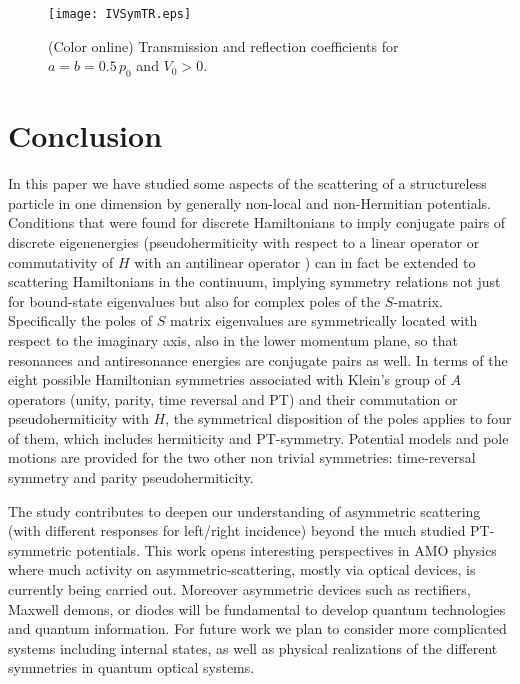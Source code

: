 \begin{figure}[t]
\begin{center}
\texttt{[image: IVSymTR.eps]}
\end{center}
\caption{(Color online) Transmission and reflection coefficients for $a=b=0.5\, p_0$ and $V_0>0$.}
\label{fig:T_R_fig2}
\end{figure}



%

\section{Conclusion}
\label{sec:RealEigenConclusions}

In this paper we have studied some aspects of the scattering of a structureless particle in one dimension by
generally non-local and non-Hermitian potentials.
Conditions that were found for discrete Hamiltonians to imply conjugate pairs of discrete eigenenergies
(pseudohermiticity with respect to a linear operator or commutativity of $H$ with an antilinear operator \cite{Mostafazadeh2002,Mostafazadeh2002a,Mostafazadeh2002b}) can in fact be extended to scattering Hamiltonians in the continuum, implying symmetry relations not just for bound-state eigenvalues
but also for complex
poles of the $S$-matrix. Specifically the poles of $S$ matrix eigenvalues
are symmetrically located with respect to the imaginary axis, also in the lower momentum plane, so that resonances and antiresonance
energies are conjugate pairs as well.
In  terms of the eight possible Hamiltonian symmetries associated with Klein's group of $A$ operators (unity, parity, time reversal and PT)
and their commutation or pseudohermiticity with $H$,
the symmetrical disposition of the poles applies to four of them, which includes hermiticity and PT-symmetry. Potential models
and pole motions are provided for the
two other non trivial symmetries: time-reversal symmetry and parity pseudohermiticity.

The study contributes to deepen our  understanding of asymmetric scattering  (with different responses for left/right incidence) beyond the
much studied  PT-symmetric potentials. This work opens interesting perspectives in AMO physics where much activity on asymmetric-scattering, mostly via optical devices,   is currently being carried out. Moreover asymmetric devices such as rectifiers, Maxwell demons, or diodes will be fundamental to  develop quantum technologies and quantum information. For future work we plan to consider more complicated systems including internal states, as well as physical realizations of the different symmetries in quantum optical systems.
